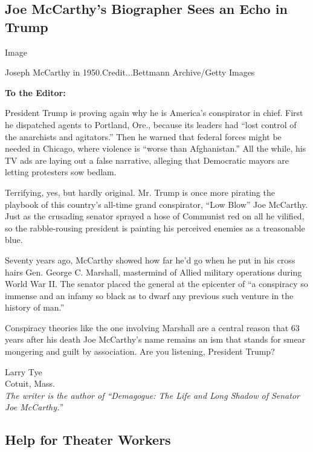 \hypertarget{joe-mccarthys-biographer-sees-an-echo-in-trump}{%
\subsection{Joe McCarthy's Biographer Sees an Echo in
Trump}\label{joe-mccarthys-biographer-sees-an-echo-in-trump}}

Image

Joseph McCarthy in 1950.Credit...Bettmann Archive/Getty Images

\textbf{To the Editor:}

President Trump is proving again why he is America's conspirator in
chief. First he dispatched agents to Portland, Ore., because its leaders
had ``lost control of the anarchists and agitators.'' Then he warned
that federal forces might be needed in Chicago, where violence is
``worse than Afghanistan.'' All the while, his TV ads are laying out a
false narrative, alleging that Democratic mayors are letting protesters
sow bedlam.

Terrifying, yes, but hardly original. Mr. Trump is once more pirating
the playbook of this country's all-time grand conspirator, ``Low Blow''
Joe McCarthy. Just as the crusading senator sprayed a hose of Communist
red on all he vilified, so the rabble-rousing president is painting his
perceived enemies as a treasonable blue.

Seventy years ago, McCarthy showed how far he'd go when he put in his
cross hairs Gen. George C. Marshall, mastermind of Allied military
operations during World War II. The senator placed the general at the
epicenter of ``a conspiracy so immense and an infamy so black as to
dwarf any previous such venture in the history of man.''

Conspiracy theories like the one involving Marshall are a central reason
that 63 years after his death Joe McCarthy's name remains an ism that
stands for smear mongering and guilt by association. Are you listening,
President Trump?

Larry Tye\\
Cotuit, Mass.\\
\emph{The writer is the author of ``Demagogue: The Life and Long Shadow
of Senator Joe McCarthy.''}

\hypertarget{help-for-theater-workers}{%
\subsection{Help for Theater Workers}\label{help-for-theater-workers}}

